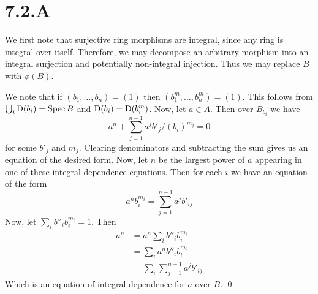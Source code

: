 \documentclass{article}
\begin{document}
\section{7.2.A}
We first note that surjective ring morphisms are integral, since any ring is
integral over itself. Therefore, we may decompose an arbitrary morphism into an
integral surjection and potentially non-integral injection. Thus we may replace
$B$ with $\phi(B)$.

We note that if $(b_1, \dots, b_n)=(1)$ then $(b_1^m, \dots, b_n^m)=(1)$. This
follows from $\bigcup_i \operatorname{D}(b_i)=\operatorname{Spec} B$ and $\operatorname{D}(b_i)=\operatorname{D}(b_i^m)$. Now, let
$a \in A$. Then over $B_{b_i}$ we have
\[
    a^n+\sum_{j=1}^{n-1}
    a^jb'_j/(b_i)^{m_j}=0
\] for some $b'_j$ and
$m_j$. Clearing denominators and subtracting the sum gives us
an equation of the desired form. Now, let $n$ be the
largest power of $a$ appearing in one of these integral
dependence equations. Then for each $i$ we have an equation
of the form \[
    a^nb_i^{m_i}=\sum_{j=1}^{n-1} a^jb'_{ij}
\] Now, let $\sum_i b''_ib_i^{m_i}=1$. Then
\begin{align*}
    a^n & =a^n\sum_i b''_ib_i^{m_i}          \\
        & =\sum_i a^nb''_ib_i^{m_i}          \\
        & =\sum_i\sum_{j=1}^{n-1} a^jb'_{ij}
\end{align*}
Which is an equation of integral dependence for $a$ over
$B$. \qed
\end{document}
